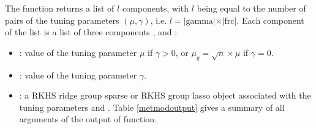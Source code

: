 The  function returns a list of $l$ components, with $l$ being equal to the number of pairs of the tuning parameters $(\mu,\gamma)$, i.e. $l=\vert \text{gamma}\vert\times\vert\text{frc}\vert$. Each component of the list is a list of three components ,  and :
\begin{itemize}
\item {}: value of the tuning parameter $\mu$ if $\gamma>0$, or $\mu_g=\sqrt{n}\times\mu$ if $\gamma=0$.
\item {}: value of the tuning parameter $\gamma$.
\item {}: a RKHS ridge group sparse or RKHS group lasso object associated with the tuning parameters  and . Table \ref{metmodoutput} gives a summary of all arguments of the output  of  function. 
\end{itemize}

